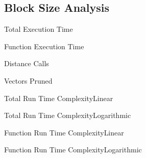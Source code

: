 \begin{frame}
\end{frame}

\subsection{Block Size Analysis}
\begin{frame}{Total Execution Time}
\end{frame}

\begin{frame}{Function Execution Time}
\end{frame}

\begin{frame}{Distance Calls}
\end{frame}

\begin{frame}{Vectors Pruned}
\end{frame}

\begin{frame}{Total Run Time Complexity}{Linear}
\end{frame}

\begin{frame}{Total Run Time Complexity}{Logarithmic}
\end{frame}

\begin{frame}{Function Run Time Complexity}{Linear}
\end{frame}

\begin{frame}{Function Run Time Complexity}{Logarithmic}
\end{frame}